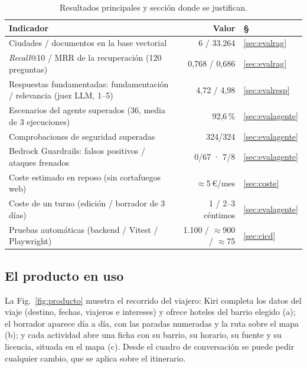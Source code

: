 \begin{table}[h]
\centering\scriptsize
\caption{Resultados principales y sección donde se justifican.}\label{tab:kpis}
\begin{tabularx}{\columnwidth}{@{}Yrl@{}}
\toprule
\textbf{Indicador} & \textbf{Valor} & \textbf{§} \\
\midrule
Ciudades / documentos en la base vectorial & 6 / 33.264 & \ref{sec:evalrag} \\
\emph{Recall}@10 / MRR de la recuperación (120 preguntas) & 0,768 / 0,686 & \ref{sec:evalrag} \\
Respuestas fundamentadas: fundamentación / relevancia (juez LLM, 1--5) & 4,72 / 4,98 & \ref{sec:evalresp} \\
Escenarios del agente superados (36, media de 3 ejecuciones) & 92,6\,\% & \ref{sec:evalagente} \\
Comprobaciones de seguridad superadas & 324/324 & \ref{sec:evalagente} \\
Bedrock Guardrails: falsos positivos / ataques frenados & 0/67 · 7/8 & \ref{sec:evalagente} \\
Coste estimado en reposo (sin cortafuegos web) & $\approx$5\,€/mes & \ref{sec:coste} \\
Coste de un turno (edición / borrador de 3 días) & 1 / 2--3 céntimos & \ref{sec:evalagente} \\
Pruebas automáticas (backend / Vitest / Playwright) & 1.100 / $\approx$900 / $\approx$75 & \ref{sec:cicd} \\
\bottomrule
\end{tabularx}
\end{table}


\subsection{El producto en uso}
La Fig.~\ref{fig:producto} muestra el recorrido del viajero: Kiri completa los datos del viaje
(destino, fechas, viajeros e intereses) y ofrece hoteles del barrio elegido (a); el borrador aparece día a día, con las paradas
numeradas y la ruta sobre el mapa (b); y cada actividad abre una ficha con su barrio, su horario, su fuente y
su licencia, situada en el mapa (c). Desde el cuadro de conversación se puede pedir cualquier
cambio, que se aplica sobre el itinerario.

